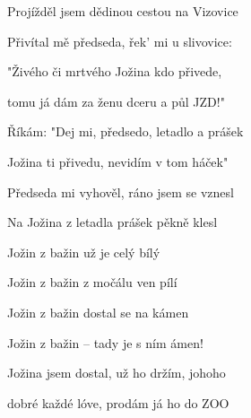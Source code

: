 \begin{song}
\bigskip

 \par
{}Projížděl jsem dědinou cestou na Vizovice \par
{}Přivítal mě předseda, řek' mi u slivovice: \par
{}"Živého či mrtvého Jožina kdo přivede, \par
{}tomu já dám za ženu dceru a půl JZD!" \par


\bigskip


\bigskip

 \par
{}Říkám: "Dej mi, předsedo, letadlo a prášek \par
{}Jožina ti přivedu, nevidím v tom háček" \par
{}Předseda mi vyhověl, ráno jsem se vznesl \par
{}Na Jožina z letadla prášek pěkně klesl \par

\bigskip

Jožin z bažin už je celý bílý \par
{}Jožin z bažin z močálu ven pílí \par
{}Jožin z bažin dostal se na kámen \par
{}Jožin z bažin – tady je s ním ámen! \par
{}Jožina jsem dostal, už ho držím, johoho  \par
{}dobré každé lóve, prodám já ho do ZOO \par

\bigskip
{} \par
{}     \par
{}    \par

\end{song}
